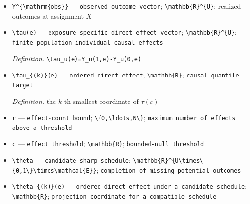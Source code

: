 \documentclass{article}
\begin{document}
\begin{itemize}
  \item \texttt{Y\textasciicircum{}\{\textbackslash{}\allowbreak{}mathrm\{obs\}\allowbreak{}\}\allowbreak{}} --- \texttt{observed outcome vector}; \texttt{\textbackslash{}\allowbreak{}mathbb\{R\}\allowbreak{}\textasciicircum{}\{U\}\allowbreak{}}; realized outcomes at assignment \(X\)
  \item \texttt{\textbackslash{}\allowbreak{}tau(e)} --- \texttt{exposure-\allowbreak{}specific direct-\allowbreak{}effect vector}; \texttt{\textbackslash{}\allowbreak{}mathbb\{R\}\allowbreak{}\textasciicircum{}\{U\}\allowbreak{}}; \texttt{finite-\allowbreak{}population individual causal effects}
  \par\smallskip\noindent\emph{Definition.} \texttt{\textbackslash{}\allowbreak{}tau\_\allowbreak{}u(e)=\allowbreak{}Y\_\allowbreak{}u(1,\allowbreak{}e)-\allowbreak{}Y\_\allowbreak{}u(0,\allowbreak{}e)}
  \item \texttt{\textbackslash{}\allowbreak{}tau\_\allowbreak{}\{(k)\}\allowbreak{}(e)} --- \texttt{ordered direct effect}; \texttt{\textbackslash{}\allowbreak{}mathbb\{R\}\allowbreak{}}; \texttt{causal quantile target}
  \par\smallskip\noindent\emph{Definition.} the \(k\)-th smallest coordinate of \(\tau(e)\)
  \item \texttt{r} --- \texttt{effect-\allowbreak{}count bound}; \texttt{\textbackslash{}\allowbreak{}\{0,\allowbreak{}\textbackslash{}\allowbreak{}ldots,\allowbreak{}N\textbackslash{}\allowbreak{}\}\allowbreak{}}; \texttt{maximum number of effects above a threshold}
  \item \texttt{c} --- \texttt{effect threshold}; \texttt{\textbackslash{}\allowbreak{}mathbb\{R\}\allowbreak{}}; \texttt{bounded-\allowbreak{}null threshold}
  \item \texttt{\textbackslash{}\allowbreak{}theta} --- \texttt{candidate sharp schedule}; \texttt{\textbackslash{}\allowbreak{}mathbb\{R\}\allowbreak{}\textasciicircum{}\{U\textbackslash{}\allowbreak{}times\textbackslash{}\allowbreak{}\{0,\allowbreak{}1\textbackslash{}\allowbreak{}\}\allowbreak{}\textbackslash{}\allowbreak{}times\textbackslash{}\allowbreak{}mathcal\{E\}\allowbreak{}\}\allowbreak{}}; \texttt{completion of missing potential outcomes}
  \item \texttt{\textbackslash{}\allowbreak{}theta\_\allowbreak{}\{(k)\}\allowbreak{}(e)} --- \texttt{ordered direct effect under a candidate schedule}; \texttt{\textbackslash{}\allowbreak{}mathbb\{R\}\allowbreak{}}; \texttt{projection coordinate for a compatible schedule}

\end{itemize}
\end{document}
